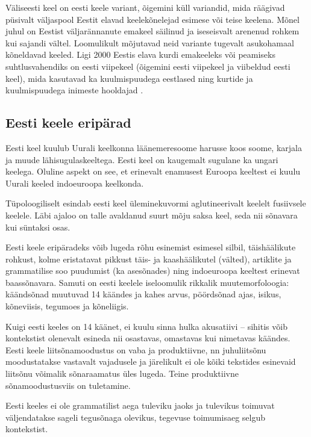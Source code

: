 \begin{multicols}{2}
Väliseesti keel on eesti keele variant, õigemini küll variandid, mida räägivad püsivalt väljaspool Eestit elavad keelekõnelejad esimese või teise keelena.  Mõnel juhul on Eestist väljarännanute emakeel säilinud ja iseseisvalt arenenud rohkem kui sajandi vältel.  Loomulikult mõjutavad neid variante tugevalt asukohamaal kõneldavad keeled.
%
Ligi 2000 Eestis elava kurdi emakeeleks või peamiseks suhtlusvahendiks on eesti viipekeel (õigemini eesti viipekeel ja viibeldud eesti keel), mida kasutavad ka kuulmispuudega eestlased ning kurtide ja kuulmispuudega inimeste hooldajad \cite{Sign}.

\subsection{Eesti keele eripärad}

Eesti keel kuulub Uurali keelkonna läänemeresoome harusse koos soome, karjala ja muude lähisugulaskeeltega.  Eesti keel on kaugemalt sugulane ka ungari keelega.  Oluline aspekt on see, et erinevalt enamusest Euroopa keeltest ei kuulu Uurali keeled indoeuroopa keelkonda.

Tüpoloogiliselt esindab eesti keel üle\-minekuvormi aglutineerivalt keelelt fusiiv\-sele keelele.  Läbi ajaloo on talle avaldanud suurt mõju saksa keel, seda nii sõnavara kui süntaksi osas.

Eesti keele eripäradeks võib lugeda rõhu esinemist esimesel silbil, täishäälikute rohkust, kolme eristatavat pikkust täis- ja kaashäälikutel (välted), artiklite ja grammatilise soo puudumist (ka asesõnades) ning indoeuroopa keeltest erinevat baassõnavara.  Samuti on eesti keelele iseloomulik rikkalik muutemorfoloogia: käändsõnad muutuvad 14 käändes ja kahes arvus, pöördsõnad ajas, isikus, kõneviisis, tegumoes ja kõneliigis.

Kuigi eesti keeles on 14 käänet, ei kuulu sinna hulka akusatiivi -- sihitis võib kontekstist olenevalt esineda nii osastavas, omastavas kui nimetavas käändes.  Eesti keele liitsõnamoodustus on vaba ja produktiivne, nn juhuliitsõnu moodustatakse vastavalt vajadusele ja järelikult ei ole kõiki tekstides esinevaid liitsõnu võimalik sõnaraamatus üles lugeda.  Teine produktiivne sõnamoodustusviis on tuletamine.


Eesti keeles ei ole grammatilist aega tuleviku jaoks ja tulevikus toimuvat väljendatakse sageli tegusõnaga olevikus, tegevuse toimumisaeg selgub kontekstist.


\end{multicols}
